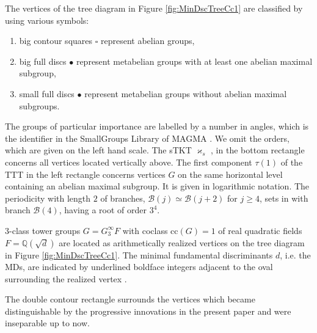\documentclass{amsart}
\theoremstyle{definition}
\numberwithin{equation}{section}
\begin{document}
The vertices of the tree diagram in Figure
\ref{fig:MinDscTreeCc1}
are classified by using various symbols:
\begin{enumerate}
\item
big contour squares \(\square\) represent abelian groups,
\item
big full discs {\Large \(\bullet\)} represent metabelian groups
with at least one abelian maximal subgroup,
\item
small full discs {\footnotesize \(\bullet\)} represent metabelian groups
without abelian maximal subgroups.
\end{enumerate}
The groups of particular importance are labelled by a number in angles,
which is the identifier in the SmallGroups Library
\cite{BEO}
of MAGMA
\cite{MAGMA}.
We omit the orders, which are given on the left hand scale.
The sTKT \(\varkappa_s\)
\cite[Thm. 2.5, Tbl. 6--7]{Ma2},
in the bottom rectangle concerns all
vertices located vertically above.
The first component \(\tau(1)\) of the TTT
\cite[Dfn. 3.3, p. 288]{Ma7}
in the left rectangle
concerns vertices \(G\) on the same horizontal level containing an abelian maximal subgroup.
It is given in logarithmic notation.
The periodicity with length \(2\) of branches,
\(\mathcal{B}(j)\simeq\mathcal{B}(j+2)\) for \(j\ge 4\),
sets in with branch \(\mathcal{B}(4)\),
having a root of order \(3^4\).

\(3\)-class tower groups \(G=G_3^\infty{F}\) with coclass \(\mathrm{cc}(G)=1\)
of real quadratic fields \(F=\mathbb{Q}(\sqrt{d})\)
are located as arithmetically realized vertices on the tree diagram in Figure
\ref{fig:MinDscTreeCc1}.
The minimal fundamental discriminants \(d\), i.e. the MDs,
are indicated by underlined boldface integers
adjacent to the oval surrounding the realized vertex
\cite{BEO,MAGMA,Ma9}.

The double contour rectangle surrounds the vertices
which became distinguishable by the progressive innovations in the present paper
and were inseparable up to now.


\renewcommand{\arraystretch}{1.1}
\end{document}
